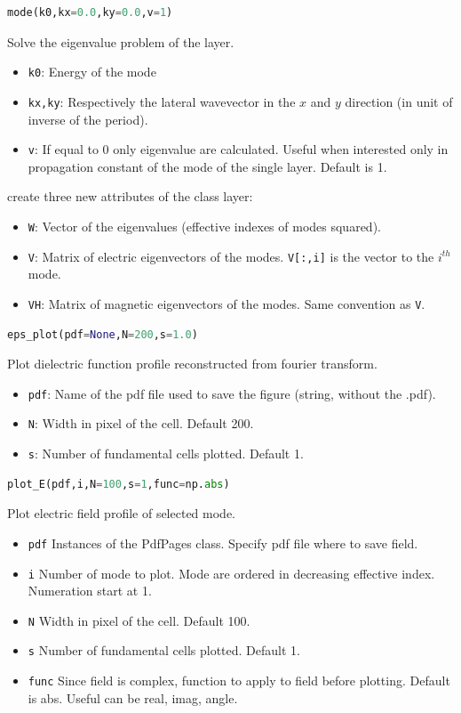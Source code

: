 \documentclass[a4paper,10pt]{report}
\begin{document}
\begin{lstlisting}[language=Python,basicstyle=\ttfamily\Large]
mode(k0,kx=0.0,ky=0.0,v=1)
\end{lstlisting}
Solve the eigenvalue problem of the layer.
\begin{itemize}[noitemsep,topsep=0pt,parsep=0pt,partopsep=0pt]
\item \texttt{k0}: Energy of the mode
\item \texttt{kx,ky}: Respectively the lateral wavevector in the $x$ and $y$ direction (in unit of inverse of the period).
\item  \texttt{v}: If equal to 0 only eigenvalue are calculated. Useful when interested only in propagation constant of the mode of the single layer. Default is 1.
\end{itemize}
create three new attributes of the class layer:
\begin{itemize}[noitemsep,topsep=0pt,parsep=0pt,partopsep=0pt]
\item \texttt{W}: Vector of the eigenvalues (effective indexes of modes squared). 
\item \texttt{V}: Matrix of electric eigenvectors of the modes. \texttt{V[:,i]} is the vector to the $i^{th}$ mode.
\item \texttt{VH}: Matrix of magnetic eigenvectors of the modes. Same convention as \texttt{V}.
\end{itemize}

\begin{lstlisting}[language=Python,basicstyle=\ttfamily\Large]
eps_plot(pdf=None,N=200,s=1.0)
\end{lstlisting}
Plot dielectric function profile reconstructed from fourier transform.
\begin{itemize}[noitemsep,topsep=0pt,parsep=0pt,partopsep=0pt]
\item \texttt{pdf}: Name of the pdf file used to save the figure (string, without the .pdf).
\item \texttt{N}: Width in pixel of the cell. Default 200.
\item \texttt{s}: Number of fundamental cells plotted. Default 1.
\end{itemize}

\begin{lstlisting}[language=Python,basicstyle=\ttfamily\Large]
plot_E(pdf,i,N=100,s=1,func=np.abs)
\end{lstlisting}
Plot electric field profile of selected mode.
\begin{itemize}[noitemsep,topsep=0pt,parsep=0pt,partopsep=0pt]
\item \texttt{pdf} Instances of the PdfPages class. Specify pdf file where to save field.
\item \texttt{i} Number of mode to plot. Mode are ordered in decreasing effective index. Numeration start at 1.
\item \texttt{N} Width in pixel of the cell. Default 100.
\item \texttt{s} Number of fundamental cells plotted. Default 1.
\item \texttt{func} Since field is complex, function to apply to field before plotting. Default is abs. Useful can be real, imag, angle. 
\end{itemize}
\end{document}
